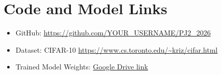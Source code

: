\documentclass[11pt,a4paper]{article}
\begin{document}
\section*{Code and Model Links}
\begin{itemize}
    \item GitHub: \url{https://github.com/YOUR_USERNAME/PJ2_2026}
    \item Dataset: CIFAR-10 \url{https://www.cs.toronto.edu/~kriz/cifar.html}
    \item Trained Model Weights: \url{Google Drive link}
\end{itemize}
\end{document}
